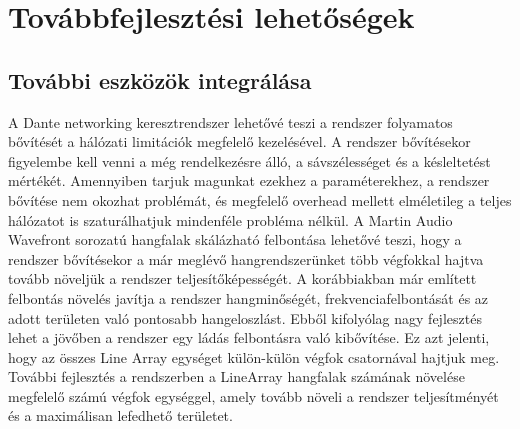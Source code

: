 \section{Továbbfejlesztési lehetőségek}
\subsection{További eszközök integrálása}
A Dante networking keresztrendszer lehetővé teszi a rendszer folyamatos bővítését a
hálózati limitációk megfelelő kezelésével. A rendszer bővítésekor figyelembe kell venni a
még rendelkezésre álló, a sávszélességet és a késleltetést mértékét. Amennyiben
tarjuk magunkat ezekhez a paraméterekhez, a rendszer bővítése nem okozhat problémát,
és megfelelő overhead mellett elméletileg a teljes hálózatot is szaturálhatjuk mindenféle probléma nélkül.
A Martin Audio Wavefront sorozatú hangfalak skálázható felbontása lehetővé teszi, hogy
a rendszer bővítésekor a már meglévő hangrendszerünket több végfokkal hajtva tovább
növeljük a rendszer teljesítőképességét. A korábbiakban már említett felbontás növelés
javítja a rendszer hangminőségét, frekvenciafelbontását és az adott területen való
pontosabb hangeloszlást. Ebből kifolyólag nagy fejlesztés lehet a jövőben a rendszer egy ládás
felbontásra való kibővítése. Ez azt jelenti, hogy az összes Line Array egységet külön-külön
végfok csatornával hajtjuk meg.
További fejlesztés a rendszerben a LineArray hangfalak számának növelése megfelelő számú végfok egységgel,
amely tovább növeli a rendszer teljesítményét és a maximálisan lefedhető területet.
